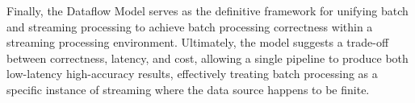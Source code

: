 Finally, the Dataflow Model\cite{10.14778/2824032.2824076} serves as the definitive framework for unifying batch and streaming processing to achieve batch processing correctness within a streaming processing environment. Ultimately, the model suggests a  trade-off between correctness, latency, and cost, allowing a single pipeline to produce both low-latency high-accuracy results, effectively treating batch processing as a specific instance of streaming where the data source happens to be finite.